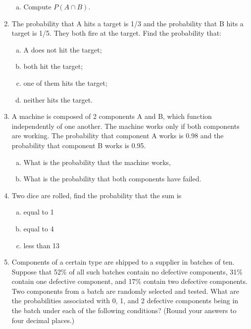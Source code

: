 \documentclass[]{article}
\begin{document}
\begin{enumerate}
\begin{itemize}
\end{itemize}
\begin{enumerate}[(a)]
\item Compute $P(A \cap B)$.
\end{enumerate}
\item     
The probability that A hits a target is 1/3 and the probability that B hits a target is 1/5.  They both fire at the target. Find the probability that:

\begin{enumerate}[(a)]
\item  A does not hit the target; 
\item  both hit the target; 
\item  one of them hits the target; 
\item  neither hits the target.
\end{enumerate}

    \item 
A machine is composed of 2 components A and B, which function independently of one another. The machine works only if both components are working. The probability that component A works is 0.98 and the probability that component B works is 0.95.

\begin{enumerate}[(a)]
\item	What is the probability that the machine works, 
\item	What is the probability that both components have failed.
\end{enumerate} 



\item Two dice are rolled, find the probability that the sum is 
\begin{enumerate}[(a)]
\item equal to 1 

\item equal to 4 

\item less than 13
\end{enumerate}




    
    
    
    \item Components of a certain type are shipped to a supplier in batches of ten. Suppose that 52\% of all such batches contain no defective components, 31\% contain one defective component, and 17\% contain two defective components. Two components from a batch are randomly selected and tested. What are the probabilities associated with 0, 1, and 2 defective components being in the batch under each of the following conditions? (Round your answers to four decimal places.)
    

\end{enumerate}
\end{document}
